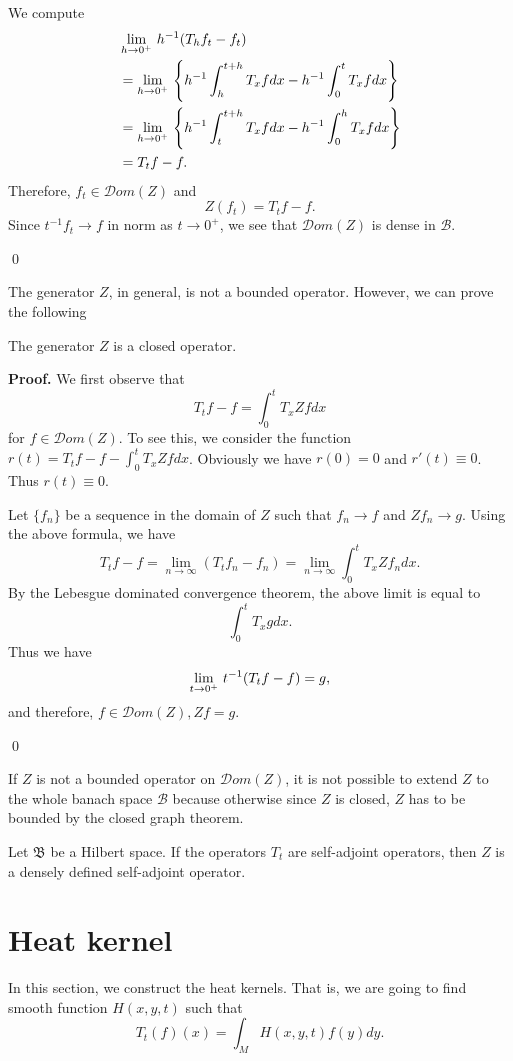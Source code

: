 We compute
\begin{align*}
& \lim_{h\to 0^+}\, h^{-1} (T_hf_t-f_t)\\
&=\lim_{h\to 0^+}\,\left\{ h^{-1}\int_h^{t+h}T_xf dx-h^{-1}\int_0^t T_x f dx\right\}\\
&=\lim_{h\to 0^+}\, \left\{ h^{-1}\int_t^{t+h}T_x f dx-h^{-1}\int_0^h T_x f dx\right\}\\
&=T_t f-f.
\end{align*}
Therefore, $f_t\in{\mathcal Dom}(Z)$ and 
\[
Z(f_t)=T_t f-f.
\]
Since $t^{-1} f_t\to f$ in norm as $t\to 0^+$, we see that ${\mathcal Dom}(Z)$ is dense in $\mathcal B$.


\qed

The generator $Z$, in general, is not a bounded operator. However, we can prove the following





\begin{lemma} The generator $Z$ is a closed operator.
\end{lemma}

{\bf Proof.}
We first observe that 
\[
T_tf-f=\int_0^t T_x Zf dx
\]
for  $f\in{\mathcal Dom}(Z)$. To see this, we consider the function $r(t)=T_tf-f-\int_0^t T_x Zf dx$. Obviously we have $r(0)=0$ and $r'(t)\equiv 0$. Thus $r(t)\equiv 0$.

Let $\{f_n\}$ be a sequence in the domain of $Z$ such that $f_n\to f$ and $Zf_n\to g$.
Using the above formula, we have
\[
T_t f-f=\lim_{n\to \infty} (T_t f_n -f_n)
=\lim_{n\to \infty}\int_0^t T_x Zf_n dx.
\]
By the Lebesgue dominated convergence theorem, the above limit is equal to 
\[
\int_0^t T_x g dx.
\]
Thus we have
\[
\lim_{t\to 0^+}\, t^{-1}(T_t f-f)=g,
\]
and therefore, $f\in{\mathcal Dom}(Z), Zf=g$.

\qed


\begin{remark}
If $Z$ is not a bounded operator on ${\mathcal Dom}(Z)$, it is not possible to extend $Z$ to the whole banach space $\mathcal B$ because otherwise since $Z$ is closed, $Z$ has to be bounded by the closed graph theorem.
\end{remark}


\begin{theorem}
Let $\mathfrak B$ be a Hilbert space. If the operators $T_t$ are self-adjoint operators, then $Z$ is a densely defined self-adjoint operator. 
\end{theorem}



\section{Heat kernel}\label{Abstract_heat_kernel}
In this section, we construct the heat kernels. That is, we are going to find smooth function $H(x,y,t)$ such that
\[
T_t(f)(x)=\int_M H(x,y,t) f(y) dy.
\]

